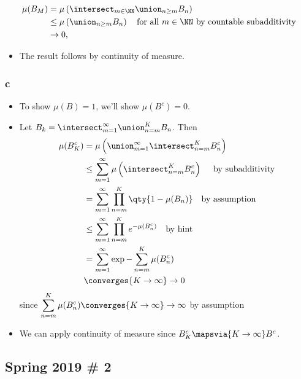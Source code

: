\begin{solution}
\begin{align*}
\mu(B_M) 
&= \mu\left(\intersect_{m\in \NN} \union_{n\geq m} B_n\right) \\
&\leq \mu\left( \union_{n\geq m} B_n \right) \quad \text{for all } m\in \NN \text{ by countable subadditivity} \\ 
&\to 0
,\end{align*}

\begin{itemize}
\tightlist
\item
  The result follows by continuity of measure.
\end{itemize}

\hypertarget{c}{%
\subsubsection{c}\label{c}}

\begin{itemize}
\item
  To show \(\mu(B) = 1\), we'll show \(\mu(B^c) = 0\).
\item
  Let \(B_k = \intersect_{m=1}^\infty \union_{n = m}^K B_n\). Then
  \begin{align*}
  \mu(B_K^c) 
  &= \mu \left(\union_{m=1}^\infty \intersect_{n=m}^K B_n^c\right) \\
  &\leq \sum_{m=1}^\infty \mu\left( \intersect_{n=m}^K B_n^c \right) \quad\text{ by subadditivity} \\
  &= \sum_{m=1}^\infty \prod_{n=m}^K \qty{1 - \mu(B_n)} \quad \text{by assumption} \\ 
  &\leq \sum_{m=1}^\infty \prod_{n=m}^K e^{-\mu(B_n^c)} \quad\text{by hint} \\
  &= \sum_{m=1}^\infty \exp{-\sum_{n=m}^K \mu(B_n^c)} \\
  &\converges{K\to\infty}\to 0
  \end{align*} since
  \(\displaystyle\sum_{n=m}^K \mu(B_n^c) \converges{K\to\infty}\to \infty\)
  by assumption
\item
  We can apply continuity of measure since
  \(B_K^c \mapsvia{K\to\infty} B^c\).
\end{itemize}


\end{solution}

\hypertarget{spring-2019-2}{%
\subsection{Spring 2019 \# 2}\label{spring-2019-2}}

